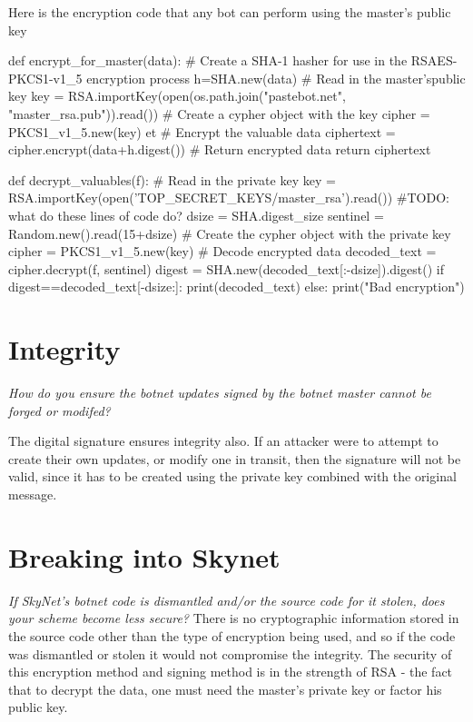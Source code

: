 \documentclass[9pt,a4paper]{article}
\begin{document}
Here is the encryption code that any bot can perform using the master's public key
\begin{center}
\vspace{-2ex}
\begin{python}
def encrypt_for_master(data):
    # Create a SHA-1 hasher for use in the RSAES-PKCS1-v1_5 encryption process
    h=SHA.new(data)
    # Read in the master'spublic key
    key = RSA.importKey(open(os.path.join("pastebot.net", "master_rsa.pub")).read())
    # Create a cypher object with the key
    cipher = PKCS1_v1_5.new(key)
et   # Encrypt the valuable data
    ciphertext = cipher.encrypt(data+h.digest())
    # Return encrypted data
    return ciphertext
\end{python}
\end{center}

\begin{center}
\vspace{-2ex}
\begin{python}
def decrypt_valuables(f):
    # Read in the private key
    key = RSA.importKey(open('TOP_SECRET_KEYS/master_rsa').read())
    #TODO: what do these lines of code do?
    dsize = SHA.digest_size
    sentinel = Random.new().read(15+dsize)
    # Create the cypher object with the private key
    cipher = PKCS1_v1_5.new(key)
    # Decode encrypted data
    decoded_text = cipher.decrypt(f, sentinel)
    digest = SHA.new(decoded_text[:-dsize]).digest()
    if digest==decoded_text[-dsize:]:
        print(decoded_text)
    else:
        print("Bad encryption")
\end{python}
\end{center}


\section{Integrity}

\emph{ How do you ensure the botnet updates signed by the botnet master cannot be forged or modifed?}

The digital signature ensures integrity also. If an attacker were to attempt to create their own updates, or modify one in transit, then the signature will not be valid, since it has to be created using the private key combined with the original message.

\section{Breaking into Skynet}
\emph{If SkyNet's botnet code is dismantled and/or the source code for it stolen, does your scheme become less secure?}
There is no cryptographic information stored in the source code other than the type of encryption being used, and so if the code was dismantled or stolen it would not compromise the integrity. The security of this encryption method and signing method is in the strength of RSA - the fact that to decrypt the data, one must need the master's private key or factor his public key.
\end{document}
